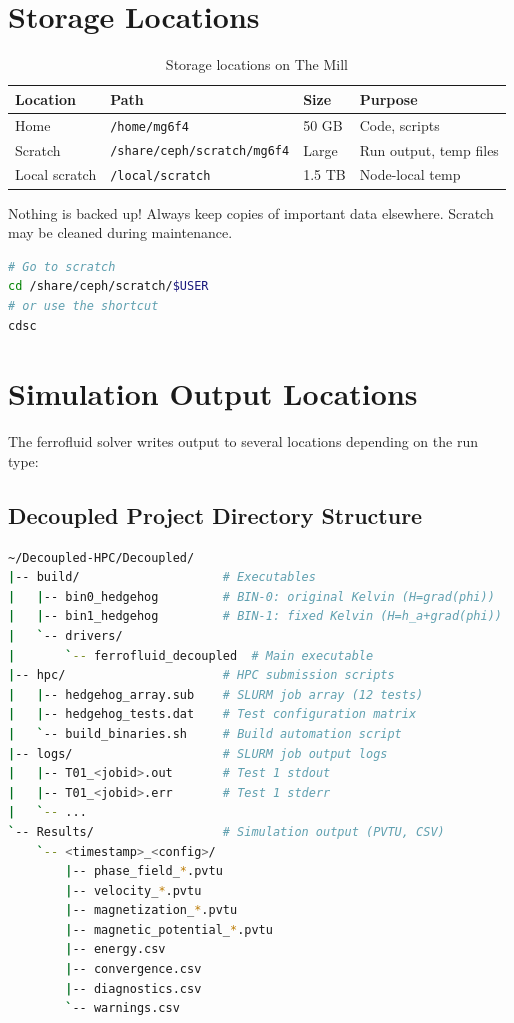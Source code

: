 \documentclass[11pt,a4paper]{article}
\begin{document}
\section{Storage Locations}
\begin{table}[h]
\centering
\begin{tabular}{@{}llll@{}}
\toprule
\textbf{Location} & \textbf{Path} & \textbf{Size} & \textbf{Purpose} \\
\midrule
Home & \texttt{/home/mg6f4} & 50 GB & Code, scripts \\
Scratch & \texttt{/share/ceph/scratch/mg6f4} & Large & Run output, temp files \\
Local scratch & \texttt{/local/scratch} & 1.5 TB & Node-local temp \\
\bottomrule
\end{tabular}
\caption{Storage locations on The Mill}
\end{table}
\begin{warningbox}
Nothing is backed up! Always keep copies of important data elsewhere.
Scratch may be cleaned during maintenance.
\end{warningbox}
\begin{lstlisting}[language=bash]
# Go to scratch
cd /share/ceph/scratch/$USER
# or use the shortcut
cdsc
\end{lstlisting}
\section{Simulation Output Locations}
The ferrofluid solver writes output to several locations depending on the run type:
\subsection{Decoupled Project Directory Structure}
\begin{lstlisting}[language=bash]
~/Decoupled-HPC/Decoupled/
|-- build/                    # Executables
|   |-- bin0_hedgehog         # BIN-0: original Kelvin (H=grad(phi))
|   |-- bin1_hedgehog         # BIN-1: fixed Kelvin (H=h_a+grad(phi))
|   `-- drivers/
|       `-- ferrofluid_decoupled  # Main executable
|-- hpc/                      # HPC submission scripts
|   |-- hedgehog_array.sub    # SLURM job array (12 tests)
|   |-- hedgehog_tests.dat    # Test configuration matrix
|   `-- build_binaries.sh     # Build automation script
|-- logs/                     # SLURM job output logs
|   |-- T01_<jobid>.out       # Test 1 stdout
|   |-- T01_<jobid>.err       # Test 1 stderr
|   `-- ...
`-- Results/                  # Simulation output (PVTU, CSV)
    `-- <timestamp>_<config>/
        |-- phase_field_*.pvtu
        |-- velocity_*.pvtu
        |-- magnetization_*.pvtu
        |-- magnetic_potential_*.pvtu
        |-- energy.csv
        |-- convergence.csv
        |-- diagnostics.csv
        `-- warnings.csv
\end{lstlisting}
\end{document}
